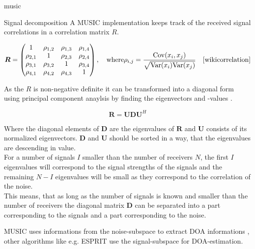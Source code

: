 \begin{subchapter}{\acrshort{music}}
\begin{subsubchapter}{Signal decomposition}
    A MUSIC implementation keeps track of the received signal
    correlations in a correlation matrix $R$.

    \begin{equation}
      \bm{R} =
        \begin{pmatrix}
          1          & \rho_{1,2} & \rho_{1,3} & \rho_{1,4} \\
          \rho_{2,1} &          1 & \rho_{2,3} & \rho_{2,4} \\
          \rho_{3,1} & \rho_{3,2} &          1 & \rho_{3,4} \\
          \rho_{4,1} & \rho_{4,2} & \rho_{4,3} &          1 \\
        \end{pmatrix} , \quad \text{where}
        \rho_{i,j} = \frac{\mathrm{Cov}(x_{i}, x_{j})}{\sqrt{\mathrm{Var}(x_{i})\mathrm{Var}(x_{j})}}
      \quad \text{\cite{wikicorrelation}}
    \end{equation}

    As the $R$ is non-negative definite \cite[p. 9]{girdmusic}
    it can be transformed into a diagonal form using
    principal component anaylsis by finding the eigenvectors and -values
    \cite[p. 325]{bronstein2016}.

    \begin{equation}
      \bm{R} = \bm{U} \bm{D} \bm{U}^{H}
    \end{equation}

    Where the diagonal elements of $\bm{D}$
    are the eigenvalues of $\bm{R}$ and $\bm{U}$
    consists of its normalized eigenvectors.
    $\bm{D}$ and $\bm{U}$ should be sorted in a way,
    that the eigenvalues are descending in value. \\

    For a number of signals $I$ smaller than the
    number of receivers $N$, the first $I$ eigenvalues
    will correspond to the signal strengths of the signals
    and the remaining $N - I$ eigenvalues will be small as they
    correspond to the correlation of the noise. \\

    This means, that as long as the number of signals is
    known and smaller than the number of receivers the
    diagonal matrix $\bm{D}$ can be separated into a part
    corresponding to the signals and a part corresponding to
    the noise.

    MUSIC uses informations from the noise-subspace to extract
    DOA informations \cite{madisetti2010}, other algorithms
    like e.g. ESPRIT use the signal-subspace for DOA-estimation. \\


\end{subsubchapter}
\end{subchapter}
